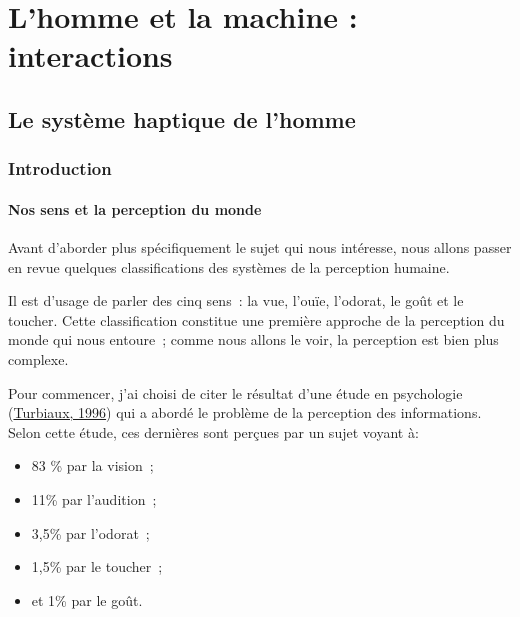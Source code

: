 \documentclass[
]{book}
\providecommand{\tightlist}{%
  \setlength{\itemsep}{0pt}\setlength{\parskip}{0pt}}
\begin{document}
\hypertarget{part-lhomme-et-la-machine-interactions}{%
\part{L'homme et la machine : interactions}\label{part-lhomme-et-la-machine-interactions}}

\hypertarget{le-systuxe8me-haptique-de-lhomme}{%
\chapter{Le système haptique de l'homme}\label{le-systuxe8me-haptique-de-lhomme}}

\hypertarget{introduction-1}{%
\section{Introduction}\label{introduction-1}}

\hypertarget{nos-sens-et-la-perception-du-monde}{%
\subsection{Nos sens et la perception du monde}\label{nos-sens-et-la-perception-du-monde}}

Avant d'aborder plus spécifiquement le sujet qui nous intéresse, nous
allons passer en revue quelques classifications des systèmes de la perception
humaine.

Il est d'usage de parler des cinq sens~: la vue, l'ouïe, l'odorat, le goût
et le toucher. Cette classification constitue une première approche de la
perception du monde qui nous entoure~; comme nous allons le voir, la
perception est bien plus complexe.

Pour commencer, j'ai choisi de citer le résultat d'une étude en
psychologie (\protect\hyperlink{ref-turbiaux1996richelle}{Turbiaux, 1996}) qui a abordé
le problème de la perception des informations. Selon cette étude, ces
dernières sont perçues par un sujet voyant à:

\begin{itemize}
\tightlist
\item
  83 \% par la vision~;
\item
  11\% par l'audition~;
\item
  3,5\% par l'odorat~;
\item
  1,5\% par le toucher~;
\item
  et 1\% par le goût.
\end{itemize}
\end{document}
